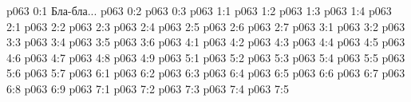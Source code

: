 \author{Носитель Жизни}
\vs p063 0:1  Бла-бла...
\vs p063 0:2 
\vs p063 0:3 \pc 
{}
\vs p063 1:1 
\vs p063 1:2 
\vs p063 1:3 
\vs p063 1:4 
\vs p063 2:1 
\vs p063 2:2 
\vs p063 2:3 
\vs p063 2:4 
\vs p063 2:5 
\vs p063 2:6 
\vs p063 2:7 
\vs p063 3:1 
\vs p063 3:2 
\vs p063 3:3 
\vs p063 3:4 \pc 
\vs p063 3:5 
\vs p063 3:6 \pc 
{}
\vs p063 4:1 
\vs p063 4:2 
\vs p063 4:3 \pc 
\vs p063 4:4 
\vs p063 4:5 \pc 
\vs p063 4:6 
\vs p063 4:7 \pc 
\vs p063 4:8 
\vs p063 4:9 
\vs p063 5:1 
\vs p063 5:2 
\vs p063 5:3 
\vs p063 5:4 
\vs p063 5:5 
\vs p063 5:6 
\vs p063 5:7 
\vs p063 6:1 
\vs p063 6:2 \pc 
\vs p063 6:3 
\vs p063 6:4 
\vs p063 6:5 
\vs p063 6:6 
\vs p063 6:7 \pc 
\vs p063 6:8 
\vs p063 6:9 
\vs p063 7:1 
\vs p063 7:2 
\vs p063 7:3 
\vs p063 7:4 \pc 
\vsetoff
\vs p063 7:5 
\quizlink
